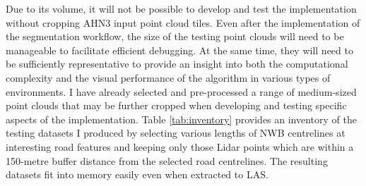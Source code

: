 Due to its volume, it will not be possible to develop and test the implementation without cropping AHN3 input point cloud tiles. Even after the implementation of the segmentation workflow, the size of the testing point clouds will need to be manageable to facilitate efficient debugging. At the same time, they will need to be sufficiently representative to provide an insight into both the computational complexity and the visual performance of the algorithm in various types of environments. I have already selected and pre-processed a range of medium-sized point clouds that may be further cropped when developing and testing specific aspects of the implementation. Table \ref{tab:inventory} provides an inventory of the testing datasets I produced by selecting various lengths of NWB centrelines at interesting road features and keeping only those Lidar points which are within a 150-metre buffer distance from the selected road centrelines. The resulting datasets fit into memory easily even when extracted to LAS.

